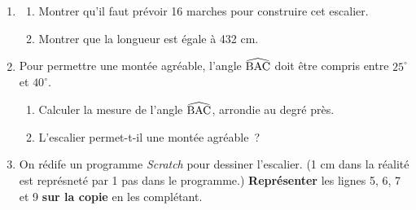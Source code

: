 \documentclass[exercice,a4]{thedocument}%
\begin{document}
\begin{enumerate}
    \item \begin{enumerate}
        \item Montrer qu'il faut prévoir 16 marches pour construire cet escalier.
        \item Montrer que la longueur  est égale à 432 cm.
    \end{enumerate}
    \item Pour permettre une montée agréable, l'angle $\widehat{\text{BAC}}$
    doit être compris entre $25^\circ$ et $40^\circ$.
    \begin{enumerate}
        \item Calculer la mesure de l'angle $\widehat{\text{BAC}}$, arrondie
        au degré près.
        \item L'escalier permet-t-il une montée agréable~?
    \end{enumerate}
    \item \begin{minipage}[t]{.5\linewidth}
        On rédife un programme \textit{Scratch} pour dessiner l'escalier.\next
        (1 cm dans la réalité est représneté par 1 pas dans le programme.)\next
        \textbf{Représenter} les lignes 5, 6, 7 et 9 \textbf{sur la copie} en
        les complétant.
    \end{minipage}
    \begin{scratch}
        {
        }
\end{scratch}
\end{enumerate}
\showthesource
\end{document}
